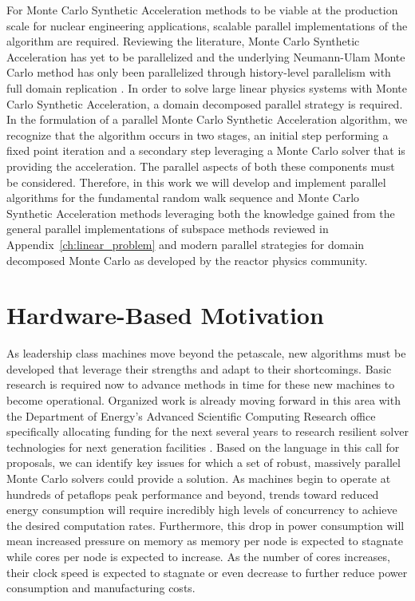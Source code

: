 For Monte Carlo Synthetic Acceleration methods to be viable at the
production scale for nuclear engineering applications, scalable
parallel implementations of the algorithm are required. Reviewing the
literature, Monte Carlo Synthetic Acceleration has yet to be
parallelized and the underlying Neumann-Ulam Monte Carlo method has
only been parallelized through history-level parallelism with full
domain replication \cite{alexandrov_efficient_1998}. In order to solve
large linear physics systems with Monte Carlo Synthetic Acceleration,
a domain decomposed parallel strategy is required. In the formulation
of a parallel Monte Carlo Synthetic Acceleration algorithm, we
recognize that the algorithm occurs in two stages, an initial step
performing a fixed point iteration and a secondary step leveraging a
Monte Carlo solver that is providing the acceleration. The parallel
aspects of both these components must be considered. Therefore, in
this work we will develop and implement parallel algorithms for the
fundamental random walk sequence and Monte Carlo Synthetic
Acceleration methods leveraging both the knowledge gained from the
general parallel implementations of subspace methods reviewed in
Appendix~\ref{ch:linear_problem} and modern parallel strategies for
domain decomposed Monte Carlo as developed by the reactor physics
community.

\section{Hardware-Based Motivation}
\label{sec:hardware_motivation}
As leadership class machines move beyond the petascale, new algorithms
must be developed that leverage their strengths and adapt to their
shortcomings. Basic research is required now to advance methods in
time for these new machines to become operational. Organized work is
already moving forward in this area with the Department of Energy's
Advanced Scientific Computing Research office specifically allocating
funding for the next several years to research resilient solver
technologies for next generation facilities
\cite{u.s._department_of_energy_resilient_2012}. Based on the language
in this call for proposals, we can identify key issues for which a set
of robust, massively parallel Monte Carlo solvers could provide a
solution. As machines begin to operate at hundreds of petaflops peak
performance and beyond, trends toward reduced energy consumption will
require incredibly high levels of concurrency to achieve the desired
computation rates. Furthermore, this drop in power consumption will
mean increased pressure on memory as memory per node is expected to
stagnate while cores per node is expected to increase. As the number
of cores increases, their clock speed is expected to stagnate or even
decrease to further reduce power consumption and manufacturing costs.

